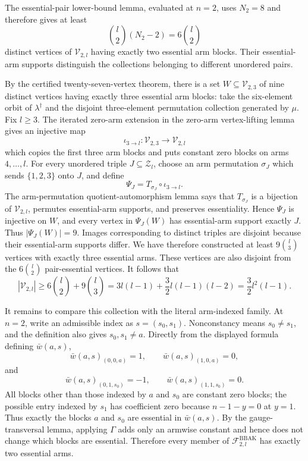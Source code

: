 The essential-pair lower-bound lemma, evaluated at \(n=2\), uses \(N_2=8\) and therefore gives at least
\[
\binom l2(N_2-2)=6\binom l2
\]
distinct vertices of \(\mathcal V_{2,l}\) having exactly two essential arm blocks. Their essential-arm supports distinguish the collections belonging to different unordered pairs.

By the certified twenty-seven-vertex theorem, there is a set \(W\subseteq\mathcal V_{2,3}\) of nine distinct vertices having exactly three essential arm blocks: take the six-element orbit of \(\lambda^\dagger\) and the disjoint three-element permutation collection generated by \(\mu\). Fix \(l\ge3\). The iterated zero-arm extension in the zero-arm vertex-lifting lemma gives an injective map
\[
\iota_{3\to l}:\mathcal V_{2,3}\longrightarrow\mathcal V_{2,l}
\]
which copies the first three arm blocks and puts constant zero blocks on arms \(4,\ldots,l\). For every unordered triple \(J\subseteq\mathcal Z_l\), choose an arm permutation \(\sigma_J\) which sends \(\{1,2,3\}\) onto \(J\), and define
\[
\Psi_J=T_{\sigma_J}\circ\iota_{3\to l}.
\]
The arm-permutation quotient-automorphism lemma says that \(T_{\sigma_J}\) is a bijection of \(\mathcal V_{2,l}\), permutes essential-arm supports, and preserves essentiality. Hence \(\Psi_J\) is injective on \(W\), and every vertex in \(\Psi_J(W)\) has essential-arm support exactly \(J\). Thus \(|\Psi_J(W)|=9\). Images corresponding to distinct triples are disjoint because their essential-arm supports differ. We have therefore constructed at least \(9\binom l3\) vertices with exactly three essential arms. These vertices are also disjoint from the \(6\binom l2\) pair-essential vertices. It follows that
\[
|\mathcal V_{2,l}|\ge6\binom l2+9\binom l3
=3l(l-1)+\frac32l(l-1)(l-2)
=\frac32l^2(l-1).
\]

It remains to compare this collection with the literal arm-indexed family. At \(n=2\), write an admissible index as \(s=(s_0,s_1)\). Nonconstancy means \(s_0\ne s_1\), and the definition also gives \(s_0,s_1\ne a\). Directly from the displayed formula defining \(\bar w(a,s)\),
\[
\bar w(a,s)_{(0,0,a)}=1,\qquad \bar w(a,s)_{(1,0,a)}=0,
\]
and
\[
\bar w(a,s)_{(0,1,s_0)}=-1,\qquad \bar w(a,s)_{(1,1,s_0)}=0.
\]
All blocks other than those indexed by \(a\) and \(s_0\) are constant zero blocks; the possible entry indexed by \(s_1\) has coefficient zero because \(n-1-y=0\) at \(y=1\). Thus exactly the blocks \(a\) and \(s_0\) are essential in \(\bar w(a,s)\). By the gauge-transversal lemma, applying \(\Gamma\) adds only an armwise constant and hence does not change which blocks are essential. Therefore every member of \(\mathcal F^{\mathrm{BBAK}}_{2,l}\) has exactly two essential arms.

